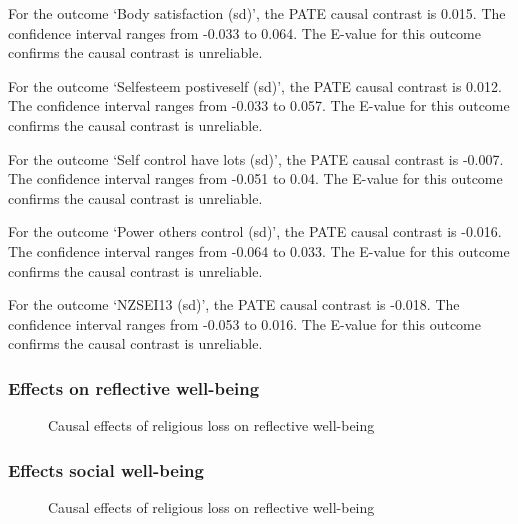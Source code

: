 \documentclass[
  singlecolumn,
  9pt]{article}
\begin{document}
For the outcome `Body satisfaction (sd)', the PATE causal contrast is
0.015. The confidence interval ranges from -0.033 to 0.064. The E-value
for this outcome confirms the causal contrast is unreliable.

For the outcome `Selfesteem postiveself (sd)', the PATE causal contrast
is 0.012. The confidence interval ranges from -0.033 to 0.057. The
E-value for this outcome confirms the causal contrast is unreliable.

For the outcome `Self control have lots (sd)', the PATE causal contrast
is -0.007. The confidence interval ranges from -0.051 to 0.04. The
E-value for this outcome confirms the causal contrast is unreliable.

For the outcome `Power others control (sd)', the PATE causal contrast is
-0.016. The confidence interval ranges from -0.064 to 0.033. The E-value
for this outcome confirms the causal contrast is unreliable.

For the outcome `NZSEI13 (sd)', the PATE causal contrast is -0.018. The
confidence interval ranges from -0.053 to 0.016. The E-value for this
outcome confirms the causal contrast is unreliable.

\subsubsection{Effects on reflective
well-being}\label{effects-on-reflective-well-being}

\begin{figure}


\caption{\label{fig-results-reflective-well-being}Causal effects of
religious loss on reflective well-being}

\end{figure}%

\subsubsection{Effects social
well-being}\label{effects-social-well-being}

\begin{figure}


\caption{\label{fig-results-social-well-being}Causal effects of
religious loss on reflective well-being}

\end{figure}%
\end{document}
